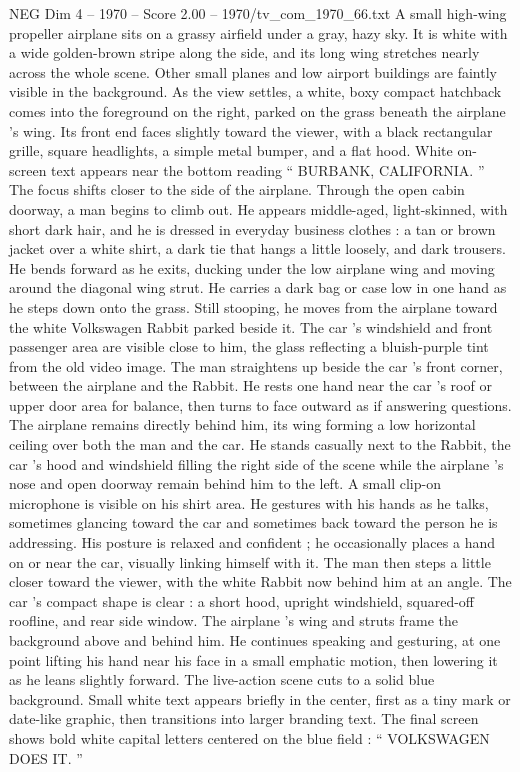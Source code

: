 \begin{textsample}{NEG Dim 4 – 1970 – Score 2.00 – 1970/tv\_com\_1970\_66.txt}  \label{ex:f4_neg_020}
A small high-wing propeller airplane sits on a grassy airfield under a gray, hazy sky.
It is white with a wide golden-brown stripe along the side, and its long wing stretches nearly across the whole scene.
Other small planes and low airport buildings are faintly visible in the background.
As the view settles, a white, boxy compact hatchback comes into the foreground on the right, parked on the grass beneath the airplane ’s wing.
Its front end faces slightly toward the viewer, with a black rectangular grille, square headlights, a simple metal bumper, and a flat hood.
White on-screen text appears near the bottom reading “ BURBANK, CALIFORNIA. ” The focus shifts closer to the side of the airplane.
Through the open cabin doorway, a man begins to climb out.
He appears middle-aged, light-skinned, with short dark hair, and he is dressed in everyday business clothes : a tan or brown jacket over a white shirt, a dark tie that hangs a little loosely, and dark trousers.
He bends forward as he exits, ducking under the low airplane wing and moving around the diagonal wing strut.
He carries a dark bag or case low in one hand as he steps down onto the grass.
Still stooping, he moves from the airplane toward the white Volkswagen Rabbit parked beside it.
The car ’s windshield and front passenger area are visible close to him, the glass reflecting a bluish-purple tint from the old video image.
The man straightens up beside the car ’s front corner, between the airplane and the Rabbit.
He rests one hand near the car ’s roof or upper door area for balance, then turns to face outward as if answering questions.
The airplane remains directly behind him, its wing forming a low horizontal ceiling over both the man and the car.
He stands casually next to the Rabbit, the car ’s hood and windshield filling the right side of the scene while the airplane ’s nose and open doorway remain behind him to the left.
A small clip-on microphone is visible on his shirt area.
He gestures with his hands as he talks, sometimes glancing toward the car and sometimes back toward the person he is addressing.
His posture is relaxed and confident ; he occasionally places a hand on or near the car, visually linking himself with it.
The man then steps a little closer toward the viewer, with the white Rabbit now behind him at an angle.
The car ’s compact shape is clear : a short hood, upright windshield, squared-off roofline, and rear side window.
The airplane ’s wing and struts frame the background above and behind him.
He continues speaking and gesturing, at one point lifting his hand near his face in a small emphatic motion, then lowering it as he leans slightly forward.
The live-action scene cuts to a solid blue background.
Small white text appears briefly in the center, first as a tiny mark or date-like graphic, then transitions into larger branding text.
The final screen shows bold white capital letters centered on the blue field : “ VOLKSWAGEN DOES IT. ”

\end{textsample}

